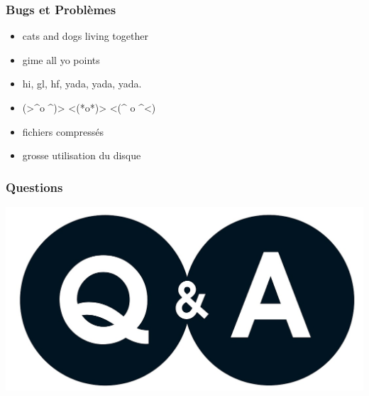 \documentclass{beamer}
\begin{document}
\begin{frame}
  \frametitle{Bugs et Problèmes}
\begin{tcolorbox}[colback=green!5,colframe=green!40!black,title=Noms d'utilisateur]
  \begin{itemize}
    \item  cats and dogs living together
    \item  gime all yo points
      \item hi, gl, hf, yada, yada, yada.
       \item (>\textasciicircum o \textasciicircum)> <(*o*)> <(\textasciicircum
         o \textasciicircum<)
  \end{itemize}

\end{tcolorbox}

\begin{tcolorbox}[colback=green!5,colframe=green!40!black,title=Performance]
  \begin{itemize}
  \item fichiers compressés
  \item grosse utilisation du disque
  \end{itemize}
\end{tcolorbox}
\end{frame}

\begin{frame}
  \frametitle{Questions}
  \begin{center}
    \includegraphics[scale=0.21,keepaspectratio]{qa}
  \end{center}
\end{frame}
\end{document}
